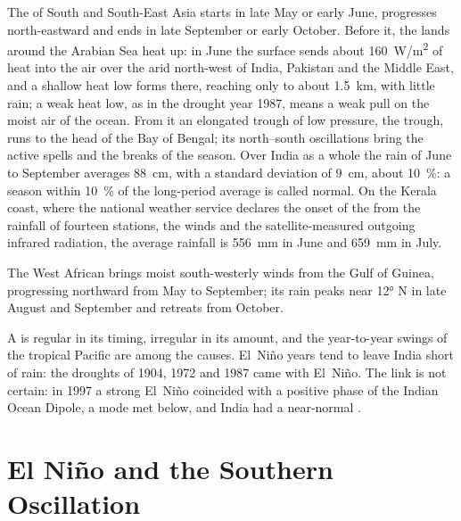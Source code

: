 The  of South and South-East Asia starts in late May or early June, progresses
north-eastward and ends in late September or early October. Before it, the lands around the
Arabian Sea heat up: in June the surface sends about \qty{160}{W/m^2} of heat into the air over
the arid north-west of India, Pakistan and the Middle East, and a shallow heat low forms there,
reaching only to about \qty{1.5}{km}, with little rain; a weak heat low, as in the drought year
1987, means a weak pull on the moist air of the ocean. From it an elongated trough of low pressure, the 
trough, runs to the head of the Bay of Bengal; its north--south oscillations bring the active
spells and the breaks of the season. Over India as a whole the rain of June to September averages
\qty{88}{cm}, with a standard deviation of \qty{9}{cm}, about \qty{10}{\percent}: a season within
\qty{10}{\percent} of the long-period average is called normal. On the Kerala coast, where the
national weather service declares the onset of the  from the rainfall of fourteen stations,
the winds and the satellite-measured outgoing infrared radiation, the average rainfall is
\qty{556}{mm} in June and \qty{659}{mm} in July.

The West African  brings moist south-westerly winds from the Gulf of Guinea, progressing
northward from May to September; its rain peaks near \ang{12} N in late August and September and
retreats from October.

A  is regular in its timing, irregular in its amount, and the year-to-year swings of the
tropical Pacific are among the causes. El~Niño years tend to leave India short of rain: the
droughts of 1904, 1972 and 1987 came with El~Niño. The link is not certain: in 1997 a strong
El~Niño coincided with a positive phase of the Indian Ocean Dipole, a mode met below, and India
had a near-normal .

\section{El Niño and the Southern Oscillation}\label{sec:b2:climate-variability:enso}

